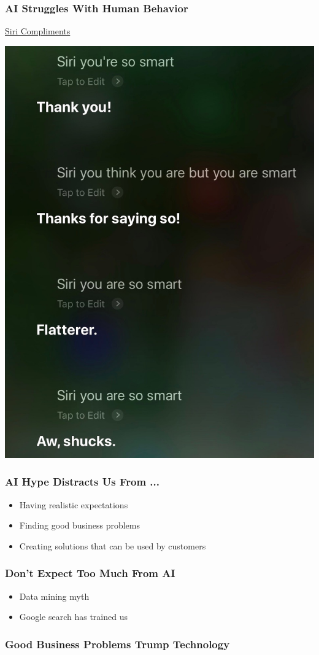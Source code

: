 \documentclass[xcolor=dvipsnames]{beamer}
\begin{document}
\begin{frame}
\frametitle{AI Struggles With Human Behavior}
\href{run:figures/siri_smart_sarcasm.m4a}{Siri Compliments}

\begin{center}
\includegraphics[height=0.7\textheight]{figures/siri_transcript.jpeg}
\end{center}
\end{frame}

\begin{frame}
\frametitle{AI Hype Distracts Us From ...}
\begin{itemize}
\item Having realistic expectations
\item Finding good business problems
\item Creating solutions that can be used by customers
\end{itemize}
\end{frame}

\begin{frame}
\frametitle{Don't Expect Too Much From AI}
\begin{itemize}
\item Data mining myth
\item Google search has trained us
\end{itemize}
\end{frame}

\begin{frame}
\frametitle{Good Business Problems Trump Technology}
\end{frame}
\end{document}

